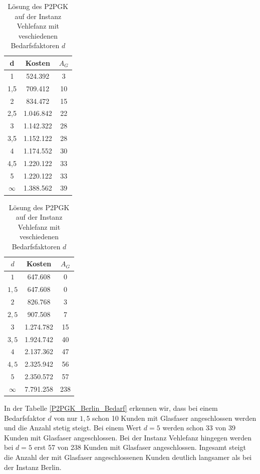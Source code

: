 \documentclass[11pt,a4paper]{article}
\theoremstyle{my_th_style1}
\begin{document}
\begin{table}[h]
	\centering
	\begin{minipage}{.35\textwidth}
			\centering
	\begin{tabular}{c|c|c}
		\centering
		d& Kosten & $A_G$ \\	
		\hline
		1& 524.392 & 3 \\
		1,5 & 709.412 & 10 \\
		2 & 834.472 & 15 \\
		2,5 & 1.046.842 & 22 \\
		3 & 1.142.322 & 28 \\
		3,5 & 1.152.122 & 28 \\
		4 & 1.174.552 & 30 \\
		4,5 & 1.220.122 & 33 \\	
		5 & 1.220.122 & 33 \\
		$\infty$ &  1.388.562 & 39 \\
	\end{tabular}
	\label{P2PGK_Berlin_Bedarf}
	\caption{Lösung des P2PGK auf der Instanz Berlin mit veschiedenen Bedarfsfaktoren}
	\end{minipage}
	\hspace{0.5cm}
	\begin{minipage}{0.35\textwidth}
			\centering
		\begin{tabular}{c|c|c}
			\centering
			$d$ & Kosten & $A_G$ \\	
			\hline
			$1$   &   647.608 & 0  \\
			$1,5$ &   647.608 & 0  \\
			$2$   &   826.768 & 3  \\
			$2,5$ &   907.508 & 7  \\
			$3$   & 1.274.782 & 15 \\
			$3,5$ & 1.924.742 & 40 \\
			$4$   & 2.137.362 & 47 \\
			$4,5$ & 2.325.942 & 56 \\
			$5$   & 2.350.572 & 57 \\
			$\infty$ & 7.791.258 & 238 \\ 
		\end{tabular}
		\label{P2PGK_Vehlefanz_Bedarf}
	\caption{Lösung des P2PGK auf der Instanz Vehlefanz mit veschiedenen Bedarfsfaktoren $d$}
	\end{minipage}
\end{table}
\vspace{0.5cm}
In der Tabelle \ref{P2PGK_Berlin_Bedarf} erkennen wir, dass  bei einem Bedarfsfaktor $d$ von nur $1,5$ schon 10 Kunden mit Glasfaser angeschlossen werden und die Anzahl stetig steigt.
Bei einem Wert $d=5$ werden schon 33 von 39 Kunden mit Glasfaser angeschlossen.
Bei der Instanz Vehlefanz hingegen werden bei $d=5$ erst 57 von 238 Kunden mit Glasfaser angeschlossen.
Ingesamt steigt die Anzahl der mit Glasfaser angeschlossenen Kunden deutlich langsamer als bei der Instanz Berlin.
\end{document}
